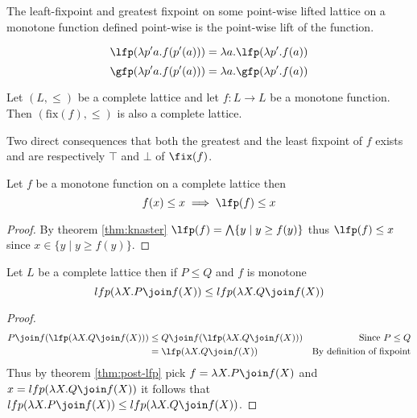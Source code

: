 \begin{theorem}
  The leaft-fixpoint and greatest fixpoint on some point-wise lifted lattice on 
  a monotone function defined point-wise is the point-wise lift of the function.

  $$\lfp(\lambda p' a . f(p'(a))) = \lambda a . \lfp(\lambda p' . f(a))$$
  $$\gfp(\lambda p' a . f(p'(a))) = \lambda a . \gfp(\lambda p' . f(a))$$
\end{theorem}

\begin{theorem}
  \label{thm:knaster}
  Let $(L, \leq)$ be a complete lattice and let $f : L \to L$ be a monotone 
  function. Then $(\text{fix}(f), \leq)$ is also a complete lattice.
\end{theorem}

Two direct consequences that both the greatest and the least fixpoint of
$f$ exists and are respectively $\top$ and $\bot$ of $\fix(f)$.

\begin{theorem}
  \label{thm:post-lfp}
  Let $f$ be a monotone function on a complete lattice then
  $$f(x) \leq x \implies \lfp(f) \leq x$$
\end{theorem}
\begin{proof}
  By theorem \ref{thm:knaster} $\lfp(f) = \bigwedge\{ y \mid y \geq f(y) \}$
  thus $\lfp(f) \leq x$ since $x \in \{ y \mid y \geq f(y) \}$.
\end{proof}

\begin{theorem}
  \label{thm:lfp-mono}
  Let $L$ be a complete lattice then if $P \leq Q$ and $f$ is monotone
  $$lfp(\lambda X. P \join f(X)) \leq lfp(\lambda X. Q \join f(X))$$
\end{theorem}
\begin{proof}
  \begin{align*}
    P \join f(\lfp(\lambda X . Q \join f(X)))
      &\leq Q \join f(\lfp(\lambda X . Q \join f(X)))
      &\text{Since $P \leq Q$} \\
      &= \lfp(\lambda X . Q \join f(X))
      &\text{By definition of fixpoint} \\
  \end{align*}
  Thus by theorem \ref{thm:post-lfp} pick $f = \lambda X . P \join f(X)$ and
  $x = lfp(\lambda X. Q \join f(X))$ it follows that
  $lfp(\lambda X. P \join f(X)) \leq lfp(\lambda X. Q \join f(X))$.
\end{proof}

